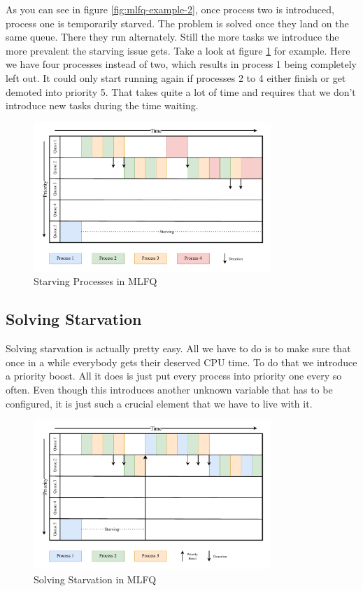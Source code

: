As you can see in figure \ref{fig:mlfq-example-2}, once process two is introduced, process one is temporarily starved. The problem is solved once they land on the same queue.
There they run alternately.
Still the more tasks we introduce the more prevalent the starving issue gets.
Take a look at figure \ref{fig:mlfq-example-3} for example. 
Here we have four processes instead of two, which results in process 1 being completely left out.
It could only start running again if processes 2 to 4 either finish or get demoted into priority 5.
That takes quite a lot of time and requires that we don't introduce new tasks during the time waiting.

\begin{figure}[h]
    \centering
    \includegraphics[width=0.8\textwidth]{Assets/MLFQ-Example-3.pdf}
    \caption{Starving Processes in MLFQ}
    \label{fig:mlfq-example-3}
\end{figure}

\subsection{Solving Starvation}

Solving starvation is actually pretty easy.
All we have to do is to make sure that once in a while everybody gets their deserved CPU time.
To do that we introduce a priority boost. All it does is just put every process into priority one every so often.
Even though this introduces another unknown variable that has to be configured, it is just such a crucial element that we have to live with it.

\begin{figure}[h]
    \centering
    \includegraphics[width=0.8\textwidth]{Assets/MLFQ-Example-4.pdf}
    \caption{Solving Starvation in MLFQ}
    \label{fig:mlfq-example-4}
\end{figure}

